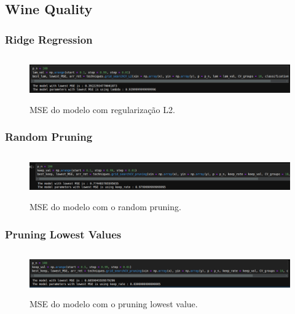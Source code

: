\documentclass{article}
\begin{document}
\subsection{Wine Quality}

\subsubsection*{Ridge Regression}

\vspace{25pt}

\begin{figure}[h]

    \centering
    \includegraphics[height=0.75in]{MSE_L2_wine.png}
    \caption{MSE do modelo com regularização L2.}
    \label{fig:example}
    
\end{figure}

\subsubsection*{Random Pruning}

\vspace{25pt}

\begin{figure}[h]

    \centering
    \includegraphics[height=0.75in]{MSE_random_prun.png}
    \caption{MSE do modelo com o random pruning.}
    \label{fig:example}
    
\end{figure}

\newpage

\subsubsection*{Pruning Lowest Values}

\vspace{25pt}

\begin{figure}[h]

    \centering
    \includegraphics[height=0.75in]{MSE_plv.png}
    \caption{MSE do modelo com o pruning lowest value.}
    \label{fig:example}
    
\end{figure}
\end{document}
